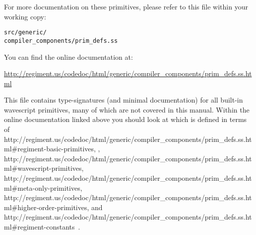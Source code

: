 \documentclass[twocolumn]{report}
\begin{document}
For more documentation on these primitives, please refer to this file
within your working copy:
\vspace{-2mm}
\begin{center}
{\tt{src/generic/\\compiler\_components/prim\_defs.ss}}
\end{center}

You can find the online documentation at:
\vspace{-2mm}
\begin{center}
\url{http://regiment.us/codedoc/html/generic/compiler\_components/prim\_defs.ss.html}
\end{center}




This file contains type-signatures (and minimal documentation) for all built-in
wavescript primitives, many of which are not covered in this manual.
Within the online documentation linked above you should look at 
which is defined in terms of 
      {http://regiment.us/codedoc/html/generic/compiler\_components/prim\_defs.ss.html\#regiment-basic-primitives},
,
          {http://regiment.us/codedoc/html/generic/compiler\_components/prim\_defs.ss.html\#wavescript-primitives},
           {http://regiment.us/codedoc/html/generic/compiler\_components/prim\_defs.ss.html\#meta-only-primitives},
        {http://regiment.us/codedoc/html/generic/compiler\_components/prim\_defs.ss.html\#higher-order-primitives},
and
             {http://regiment.us/codedoc/html/generic/compiler\_components/prim\_defs.ss.html\#regiment-constants}~.
\end{document}
